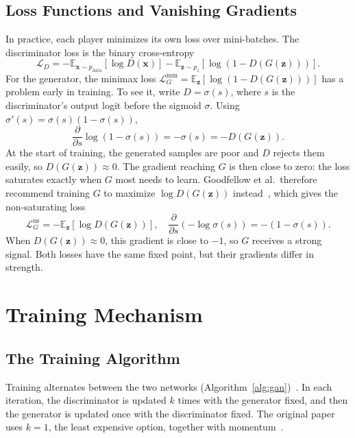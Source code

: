 \documentclass[conference]{IEEEtran}
\newcommand{\E}{\mathbb{E}}
\newcommand{\pdata}{p_{\mathrm{data}}}
\begin{document}
\subsection{Loss Functions and Vanishing Gradients}
In practice, each player minimizes its own loss over mini-batches. The discriminator loss is the binary cross-entropy
\begin{equation}
\mathcal{L}_D=-\E_{\mathbf{x}\sim\pdata}[\log D(\mathbf{x})]-\E_{\mathbf{z}\sim p_z}[\log(1-D(G(\mathbf{z})))].
\end{equation}
For the generator, the minimax loss $\mathcal{L}_G^{\mathrm{mm}}=\E_{\mathbf{z}}[\log(1-D(G(\mathbf{z})))]$ has a problem early in training. To see it, write $D=\sigma(s)$, where $s$ is the discriminator's output logit before the sigmoid $\sigma$. Using $\sigma'(s)=\sigma(s)(1-\sigma(s))$,
\begin{equation}
\frac{\partial}{\partial s}\log\left(1-\sigma(s)\right)=-\sigma(s)=-D(G(\mathbf{z})).
\end{equation}
At the start of training, the generated samples are poor and $D$ rejects them easily, so $D(G(\mathbf{z}))\approx0$. The gradient reaching $G$ is then close to zero: the loss saturates exactly when $G$ most needs to learn. Goodfellow et al.\ therefore recommend training $G$ to maximize $\log D(G(\mathbf{z}))$ instead~\cite{goodfellow2014}, which gives the non-saturating loss
\begin{equation}
\mathcal{L}_G^{\mathrm{ns}}=-\E_{\mathbf{z}}\left[\log D(G(\mathbf{z}))\right],\quad \frac{\partial}{\partial s}\left(-\log\sigma(s)\right)=-(1-\sigma(s)).
\end{equation}
When $D(G(\mathbf{z}))\approx0$, this gradient is close to $-1$, so $G$ receives a strong signal. Both losses have the same fixed point, but their gradients differ in strength.

\section{Training Mechanism}
\subsection{The Training Algorithm}
Training alternates between the two networks (Algorithm~\ref{alg:gan})~\cite{goodfellow2014}. In each iteration, the discriminator is updated $k$ times with the generator fixed, and then the generator is updated once with the discriminator fixed. The original paper uses $k=1$, the least expensive option, together with momentum~\cite{goodfellow2014}.
\end{document}
